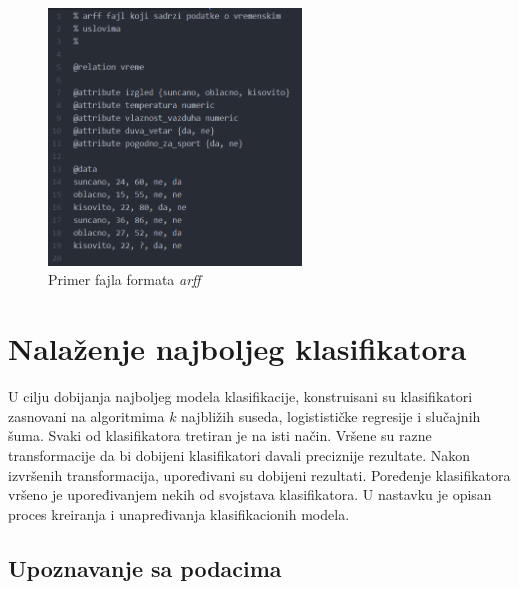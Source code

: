 \documentclass[12pt,oneside]{memoir}
\begin{document}
\begin{figure}[!ht]
  \centering
  \includegraphics[width=0.60\textwidth]{arff.png}
  \caption{Primer fajla formata \textit{arff}}
  \label{fig:arff}
\end{figure}

\section{Nalaženje najboljeg klasifikatora}

U cilju dobijanja najboljeg modela klasifikacije, konstruisani su klasifikatori zasnovani na algoritmima $k$ najbližih suseda, logistističke regresije i slučajnih šuma. Svaki od klasifikatora tretiran je na isti način. Vršene su razne transformacije da bi dobijeni klasifikatori davali preciznije rezultate. Nakon izvršenih transformacija, upoređivani su dobijeni rezultati. Poređenje klasifikatora vršeno je upoređivanjem nekih od svojstava klasifikatora. U nastavku je opisan proces kreiranja i unapređivanja klasifikacionih modela.  







\subsection{Upoznavanje sa podacima}  \label{upoznavanje}
\end{document}
